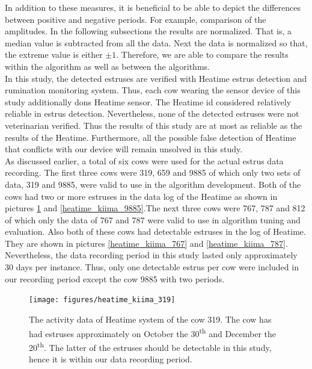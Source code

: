 \documentclass[english,12pt,a4paper,pdftex,elec,utf8]{aaltothesis}
\begin{document}
In addition to these measures, it is beneficial to be able to depict the differences between positive and negative periods. For example, comparison of the amplitudes. In the following subsections the results are normalized. That is, a median value is subtracted from all the data. Next the data is normalized so that, the extreme value is either $\pm1$. Therefore, we are able to compare the results within the algorithm as well as between the algorithms. \\
In this study, the detected estruses are verified with Heatime estrus detection and rumination monitoring system. Thus, each cow wearing the sensor device of this study additionally dons Heatime sensor. The Heatime id considered relatively reliable in estrus detection. Nevertheless, none of the detected estruses were not veterinarian verified. Thus the results of this study are at most as reliable as the results of the Heatime. Furthermore, all the possible false detection of Heatime that conflicts with our device will remain unsolved in this study. \\
As discussed earlier, a total of six cows were used for the actual estrus data recording. The first three cows were 319, 659 and 9885 of which only two sets of data, 319 and 9885, were valid to use in the algorithm development. Both of the cows had two or more estruses in the data log of the Heatime as shown in pictures \ref{heatime_kiima_319} and \ref{heatime_kiima_9885}.The next three cows were 767, 787 and 812 of which only the data of 767 and 787 were valid to use in algorithm tuning and evaluation. Also both of these cows had detectable estruses in the log of Heatime. They are shown in pictures \ref{heatime_kiima_767} and \ref{heatime_kiima_787}. Nevertheless, the data recording period in this study lasted only approximately 30 days per instance. Thus, only one detectable estrus per cow were included in our recording period except the cow 9885 with two periods.




\begin{figure}[h]
\centering
\texttt{[image: figures/heatime\_kiima\_319]}
\caption{The activity data of Heatime system of the cow 319. The cow has had estruses approximately on October the 30\textsuperscript{th} and December the 20\textsuperscript{th}. The latter of the estruses should be detectable in this study, hence it is within our data recording period.}
\label{heatime_kiima_319}
\end{figure}
\end{document}
